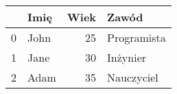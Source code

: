 \begin{tabular}{rlrl}
\hline
    & Imię   &   Wiek & Zawód       \\
\hline
  0 & John   &     25 & Programista \\
  1 & Jane   &     30 & Inżynier    \\
  2 & Adam   &     35 & Nauczyciel  \\
\hline
\end{tabular}